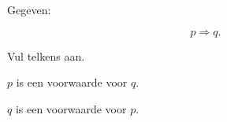 \documentclass{ximera}
\begin{document}
\begin{oefening}[Vertalen]{\oefB\ESS}

Gegeven:

\[
p\Rightarrow q.
\]

Vul telkens aan.

\begin{question}

$p$ is een  voorwaarde voor $q$.

\end{question}


\begin{question}

$q$ is een  voorwaarde voor $p$.

\end{question}

\end{oefening}


\end{document}
